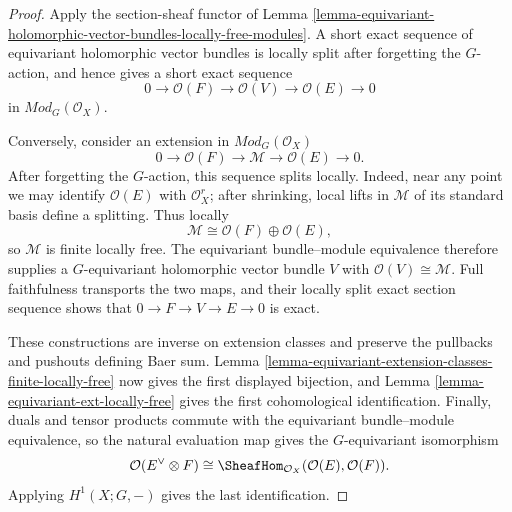 \begin{proof}
Apply the section-sheaf functor of Lemma
\ref{lemma-equivariant-holomorphic-vector-bundles-locally-free-modules}.
A short exact sequence of equivariant holomorphic vector bundles is locally
split after forgetting the $G$-action, and hence gives a short exact sequence
$$
0 \longrightarrow \mathcal O(F) \longrightarrow \mathcal O(V)
\longrightarrow \mathcal O(E) \longrightarrow 0
$$
in $\textit{Mod}_G(\mathcal O_X)$.

Conversely, consider an extension in $\textit{Mod}_G(\mathcal O_X)$
$$
0 \longrightarrow \mathcal O(F) \longrightarrow \mathcal M
\longrightarrow \mathcal O(E) \longrightarrow 0.
$$
After forgetting the $G$-action, this sequence splits locally. Indeed, near
any point we may identify $\mathcal O(E)$ with $\mathcal O_X^r$; after
shrinking, local lifts in $\mathcal M$ of its standard basis define a
splitting. Thus locally
$$
\mathcal M \cong \mathcal O(F)\oplus\mathcal O(E),
$$
so $\mathcal M$ is finite locally free. The equivariant bundle--module
equivalence therefore supplies a $G$-equivariant holomorphic vector bundle
$V$ with $\mathcal O(V)\cong\mathcal M$. Full faithfulness transports the
two maps, and their locally split exact section sequence shows that
$0\to F\to V\to E\to0$ is exact.

These constructions are inverse on extension classes and preserve the
pullbacks and pushouts defining Baer sum. Lemma
\ref{lemma-equivariant-extension-classes-finite-locally-free} now gives the
first displayed bijection, and Lemma
\ref{lemma-equivariant-ext-locally-free} gives the first cohomological
identification. Finally, duals and tensor products commute with the
equivariant bundle--module equivalence, so the natural evaluation map gives
the $G$-equivariant isomorphism
$$
\mathcal O(E^\vee\otimes F)
\cong
\SheafHom_{\mathcal O_X}(\mathcal O(E),\mathcal O(F)).
$$
Applying $H^1(X;G,-)$ gives the last identification.
\end{proof}

